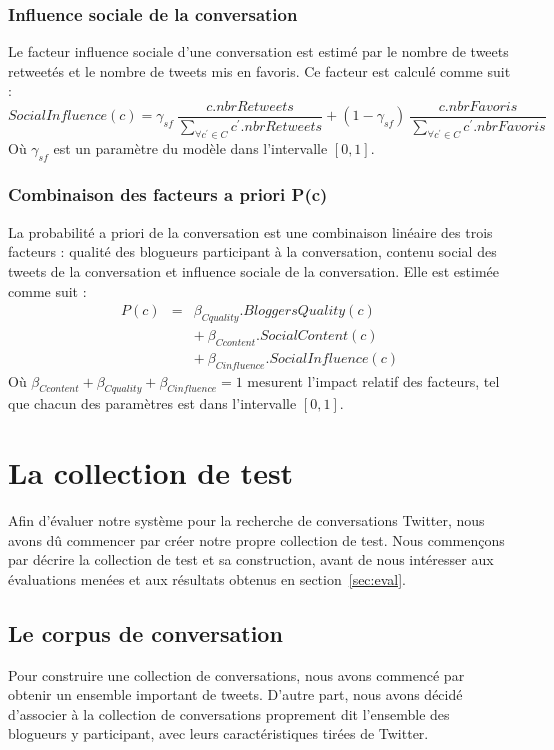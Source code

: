 \documentclass{article-hermes}
\begin{document}
\subsubsection{Influence sociale de la conversation}
 \par Le facteur influence sociale d'une conversation est estimé par le nombre de tweets retweetés et le nombre de tweets mis en favoris. Ce facteur est calculé comme suit : 
\begin{equation}
SocialInfluence(c) = \gamma_{sf} ~ \frac{c.nbrRetweets}{\sum_{\forall{c^{'} \in C}}c^{'}.nbrRetweets} + (1-\gamma_{sf})~\frac{c.nbrFavoris}{\sum_{\forall{c^{'} \in C}}c^{'}.nbrFavoris}
\end{equation}
Où $\gamma_{sf}$ est un paramètre du modèle dans l'intervalle  $[0,1]$.

\subsubsection{Combinaison des facteurs a priori P(c)}

\par La probabilité a priori de la conversation est une combinaison linéaire des trois facteurs : qualité des blogueurs participant à la conversation, contenu social des tweets de la conversation et influence sociale de la conversation. Elle est estimée comme suit :
\begin{eqnarray}
\label{eq:p(c)}
P(c) &=& \beta_{Cquality}.BloggersQuality(c) \nonumber\\ 
&&  + ~ \beta_{Ccontent}.SocialContent(c) \nonumber \\
&& + ~ \beta_{Cinfluence}.SocialInfluence(c)
\end{eqnarray}
Où $\beta_{Ccontent} + \beta_{Cquality} +\beta_{Cinfluence} = 1$ mesurent l'impact relatif des facteurs, tel que chacun des paramètres est dans l'intervalle $[0,1]$.


\section{La collection de test}
\label{sec:colltest}
Afin d'évaluer notre système pour la recherche de conversations Twitter, nous avons dû commencer par créer notre propre collection de test. Nous commençons par décrire la collection de test et sa construction, avant de nous intéresser aux évaluations menées et aux résultats obtenus en section~\ref{sec:eval}.

\subsection{Le corpus de conversation}
\par Pour construire une collection de conversations, nous avons commencé par obtenir un ensemble important de tweets. D'autre part, nous avons décidé d'associer à la collection de conversations proprement dit l'ensemble des blogueurs y participant, avec leurs caractéristiques tirées de Twitter.
\end{document}
